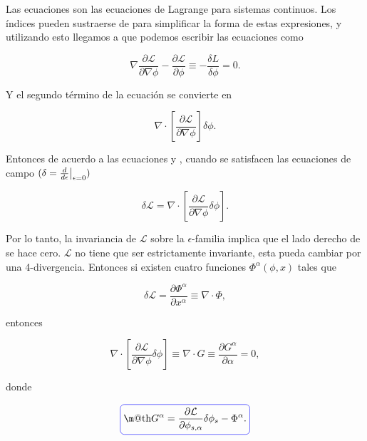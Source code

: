 \documentclass[a4paper,10pt]{article}
\makeatletter
\numberwithin{equation}{section}
\newcommand{\zerodel}{.\kern-\nulldelimiterspace}
\newcommand*{\boxcolor}{blue}
\renewcommand{\boxed}[1]{\textcolor{\boxcolor}{%
\tikz[baseline={([yshift=-1ex]current bounding box.center)}] \node [rectangle, minimum width=1ex,rounded corners,draw] {\normalcolor\m@th$\displaystyle#1$};}}
\makeatother
\begin{document}
Las ecuaciones  son las ecuaciones de Lagrange para sistemas continuos. 
Los índices pueden sustraerse de para simplificar la forma de estas expresiones, y 
utilizando esto llegamos a que podemos escribir las ecuaciones  como

\begin{equation}
 \nabla \frac{\partial \mathcal{L}}{\partial \nabla \phi} 
 - \frac{\partial \mathcal{L}}{\partial \phi} \equiv - \frac{\delta L}{\delta \phi} = 0.
 \label{eq:noet5}
\end{equation}

Y el segundo término de la ecuación  se convierte en 

\begin{equation}
 \nabla \cdot \left[ \frac{\partial \mathcal{L}}{\partial \nabla \phi}\right] \delta \phi.
 \label{eq:noet6}
\end{equation}

Entonces de acuerdo a las ecuaciones  y , cuando 
se satisfacen las ecuaciones de campo $(\delta = \left\zerodel\frac{d}{d\epsilon}\right|_{\epsilon=0})$

\begin{equation}
 \delta \mathcal{L} =  \nabla \cdot \left[ \frac{\partial \mathcal{L}}{\partial \nabla \phi} \delta \phi\right].
 \label{eq:noet7}
\end{equation}

Por lo tanto, la invariancia de $\mathcal{L}$ sobre la $\epsilon$-familia implica 
que el lado derecho de  se hace cero. $\mathcal{L}$ no tiene que 
ser estrictamente invariante, esta pueda cambiar por una 4-divergencia. Entonces 
si existen cuatro funciones $\Phi^\alpha(\phi,x)$ tales que 

\begin{equation}
 \delta \mathcal{L} = \frac{\partial \Phi^\alpha}{\partial x^\alpha} \equiv \nabla \cdot \Phi,
 \label{eq:noet8}
\end{equation}

entonces 

\begin{equation}
 \nabla \cdot \left[ \frac{\partial \mathcal{L}}{\partial \nabla \phi} \delta \phi \right] 
 \equiv \nabla \cdot G \equiv \frac{\partial G^\alpha}{\partial \alpha} = 0,
 \label{eq:noet9}
\end{equation}

donde 

\begin{equation}
 \boxed{G^\alpha = \frac{\partial \mathcal{L}}{\partial \phi_{s,\alpha}}\delta \phi_s - 
 \Phi^\alpha.}
 \label{eq:noet10}
\end{equation}
\end{document}
